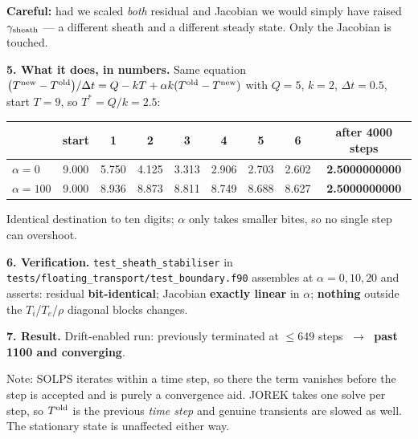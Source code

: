 \documentclass[11pt,a4paper]{article}
\newcommand{\code}[1]{\texttt{\small #1}}
\newcommand{\Told}{T^{\rm old}}\newcommand{\Tnew}{T^{\rm new}}
\begin{document}
\vspace{3pt}
\textcolor{red!60!black}{\textbf{Careful:}} had we scaled \emph{both} residual and Jacobian we
would simply have raised $\gamma_{\rm sheath}$ --- a different sheath and a different steady state.
Only the Jacobian is touched.

\vspace{6pt}
\textbf{5. What it does, in numbers.} Same equation
$\bigl(\Tnew-\Told\bigr)/\Delta t=Q-kT+\alpha k(\Told-\Tnew)$ with $Q=5$, $k=2$,
$\Delta t=0.5$, start $T=9$, so $T^{*}=Q/k=2.5$:
\begin{center}\small
\begin{tabular}{lccccccc c}
\toprule
& start & 1 & 2 & 3 & 4 & 5 & 6 & after 4000 steps\\
\midrule
$\alpha=0$   & 9.000 & 5.750 & 4.125 & 3.313 & 2.906 & 2.703 & 2.602 & \textbf{2.5000000000}\\
$\alpha=100$ & 9.000 & 8.936 & 8.873 & 8.811 & 8.749 & 8.688 & 8.627 & \textbf{2.5000000000}\\
\bottomrule
\end{tabular}
\end{center}
\vspace{-3pt}
Identical destination to ten digits; $\alpha$ only takes smaller bites, so no single step can
overshoot.

\vspace{5pt}
\textbf{6. Verification.} \code{test\_sheath\_stabiliser} in
\code{tests/floating\_transport/test\_boundary.f90} assembles at $\alpha=0,10,20$ and asserts:
residual \textbf{bit-identical}; Jacobian \textbf{exactly linear} in $\alpha$; \textbf{nothing}
outside the $T_i$/$T_e$/$\rho$ diagonal blocks changes.

\vspace{5pt}
\textbf{7. Result.} Drift-enabled run: previously terminated at $\le649$ steps
$\;\rightarrow\;$ \textbf{past 1100 and converging}.

\vspace{3pt}
{\footnotesize\textcolor{black!55}{Note: SOLPS iterates within a time step, so there the term
vanishes before the step is accepted and is purely a convergence aid. JOREK takes one solve per
step, so $\Told$ is the previous \emph{time step} and genuine transients are slowed as well. The
stationary state is unaffected either way.}}
\end{document}
